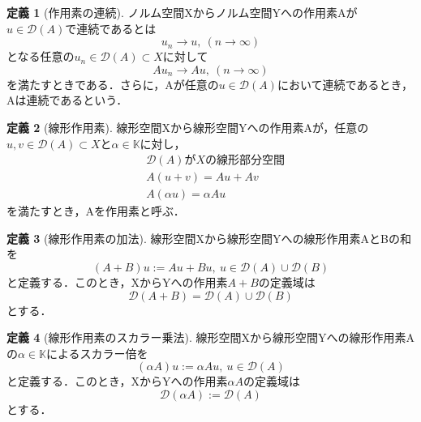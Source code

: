 \documentclass[11pt,a4paper]{jsarticle}
\theoremstyle{definition}
\newtheorem{dfn}{定義}
\begin{document}
\begin{dfn}[作用素の連続]
  ノルム空間Xからノルム空間Yへの作用素Aが$u\in\mathcal{D}(A)$で連続であるとは
  \begin{equation*}
    u_n \rightarrow u, \ (n\rightarrow \infty)
  \end{equation*}
  となる任意の$u_n\in\mathcal{D}(A)\subset X$に対して
  \begin{equation*}
    Au_n\rightarrow Au, \ (n\rightarrow \infty)
  \end{equation*}
  を満たすときである．さらに，Aが任意の$u\in\mathcal{D}(A)$において連続であるとき，Aは連続であるという．
\end{dfn}

\begin{dfn}[線形作用素]
  線形空間Xから線形空間Yへの作用素Aが，任意の$u,v\in\mathcal{D}(A)\subset X$と$\alpha\in\mathbb{K}$に対し，
  \begin{align*}
     & \mathcal{D}(A)がXの線形部分空間 \\
     & A(u+v)=Au+Av                    \\
     & A(\alpha u)=\alpha Au
  \end{align*}
  を満たすとき，Aを作用素と呼ぶ．
\end{dfn}

\begin{dfn}[線形作用素の加法]
  \label{dfn:線形作用素の加法}
  線形空間Xから線形空間Yへの線形作用素AとBの和を
  \begin{equation*}
    (A+B)u := Au+Bu, \ u\in\mathcal{D}(A)\cup\mathcal{D}(B)
  \end{equation*}
  と定義する．このとき，XからYへの作用素$A+B$の定義域は
  \begin{equation*}
    \mathcal{D}(A+B) = \mathcal{D}(A)\cup\mathcal{D}(B)
  \end{equation*}
  とする．
\end{dfn}

\begin{dfn}[線形作用素のスカラー乗法]
  \label{dfn:線形作用素のスカラー乗法}
  線形空間Xから線形空間Yへの線形作用素Aの$\alpha\in\mathbb{K}$によるスカラー倍を
  \begin{equation*}
    (\alpha A)u := \alpha Au, \ u\in\mathcal{D}(A)
  \end{equation*}
  と定義する．このとき，XからYへの作用素$\alpha A$の定義域は
  \begin{equation*}
    \mathcal{D}(\alpha A):= \mathcal{D}(A)
  \end{equation*}
  とする．
\end{dfn}
\end{document}
